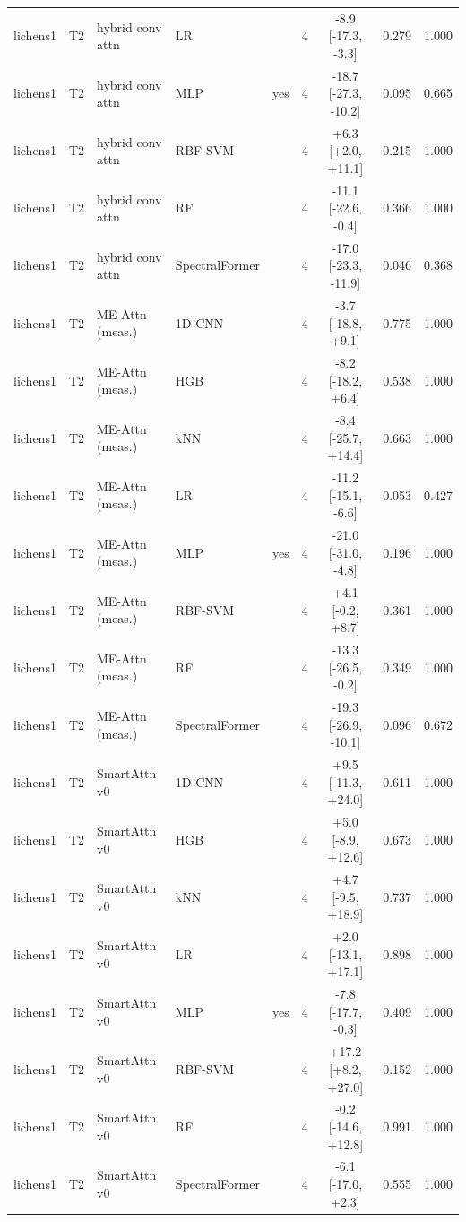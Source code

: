 \begin{tabular}{lllllcccc}
lichens1 & T2 & hybrid conv attn & LR &  & 4 & -8.9 [-17.3, -3.3] & 0.279 & 1.000 \\
lichens1 & T2 & hybrid conv attn & MLP & yes & 4 & -18.7 [-27.3, -10.2] & 0.095 & 0.665 \\
lichens1 & T2 & hybrid conv attn & RBF-SVM &  & 4 & +6.3 [+2.0, +11.1] & 0.215 & 1.000 \\
lichens1 & T2 & hybrid conv attn & RF &  & 4 & -11.1 [-22.6, -0.4] & 0.366 & 1.000 \\
lichens1 & T2 & hybrid conv attn & SpectralFormer &  & 4 & -17.0 [-23.3, -11.9] & 0.046 & 0.368 \\
lichens1 & T2 & ME-Attn (meas.) & 1D-CNN &  & 4 & -3.7 [-18.8, +9.1] & 0.775 & 1.000 \\
lichens1 & T2 & ME-Attn (meas.) & HGB &  & 4 & -8.2 [-18.2, +6.4] & 0.538 & 1.000 \\
lichens1 & T2 & ME-Attn (meas.) & kNN &  & 4 & -8.4 [-25.7, +14.4] & 0.663 & 1.000 \\
lichens1 & T2 & ME-Attn (meas.) & LR &  & 4 & -11.2 [-15.1, -6.6] & 0.053 & 0.427 \\
lichens1 & T2 & ME-Attn (meas.) & MLP & yes & 4 & -21.0 [-31.0, -4.8] & 0.196 & 1.000 \\
lichens1 & T2 & ME-Attn (meas.) & RBF-SVM &  & 4 & +4.1 [-0.2, +8.7] & 0.361 & 1.000 \\
lichens1 & T2 & ME-Attn (meas.) & RF &  & 4 & -13.3 [-26.5, -0.2] & 0.349 & 1.000 \\
lichens1 & T2 & ME-Attn (meas.) & SpectralFormer &  & 4 & -19.3 [-26.9, -10.1] & 0.096 & 0.672 \\
lichens1 & T2 & SmartAttn v0 & 1D-CNN &  & 4 & +9.5 [-11.3, +24.0] & 0.611 & 1.000 \\
lichens1 & T2 & SmartAttn v0 & HGB &  & 4 & +5.0 [-8.9, +12.6] & 0.673 & 1.000 \\
lichens1 & T2 & SmartAttn v0 & kNN &  & 4 & +4.7 [-9.5, +18.9] & 0.737 & 1.000 \\
lichens1 & T2 & SmartAttn v0 & LR &  & 4 & +2.0 [-13.1, +17.1] & 0.898 & 1.000 \\
lichens1 & T2 & SmartAttn v0 & MLP & yes & 4 & -7.8 [-17.7, -0.3] & 0.409 & 1.000 \\
lichens1 & T2 & SmartAttn v0 & RBF-SVM &  & 4 & +17.2 [+8.2, +27.0] & 0.152 & 1.000 \\
lichens1 & T2 & SmartAttn v0 & RF &  & 4 & -0.2 [-14.6, +12.8] & 0.991 & 1.000 \\
lichens1 & T2 & SmartAttn v0 & SpectralFormer &  & 4 & -6.1 [-17.0, +2.3] & 0.555 & 1.000 \\

\end{tabular}
